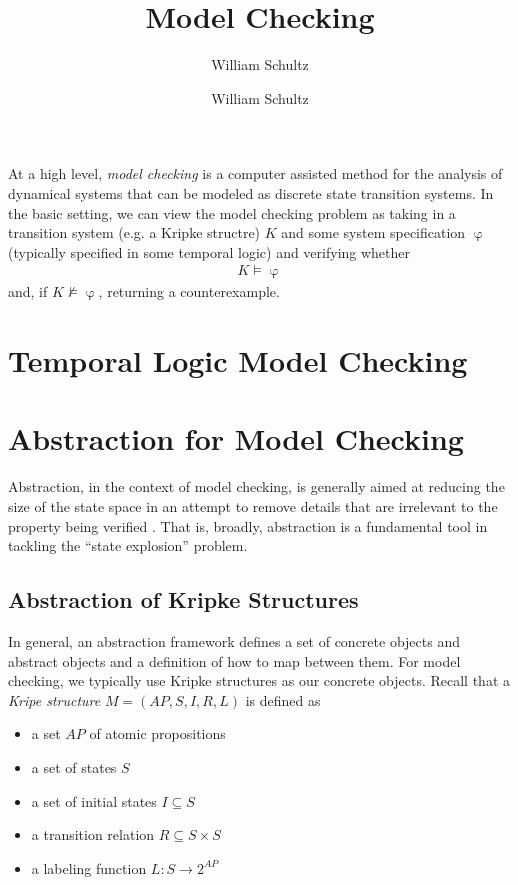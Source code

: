 \documentclass[10pt,a4paper]{article}
\author{William Schultz}
\begin{document}
\title{Model Checking}
\author{William Schultz}
\maketitle

At a high level, \textit{model checking} is a computer assisted method for the analysis of dynamical systems that can be modeled as discrete state transition systems. In the basic setting, we can view the model checking problem as taking in a transition system (e.g. a Kripke structre) $K$ and some system specification $\upvarphi$ (typically specified in some temporal logic)  and verifying whether 
\begin{align*}
    K \vDash \upvarphi
\end{align*}
and, if $K \nvDash \upvarphi$, returning a counterexample.

\section{Temporal Logic Model Checking}




\section{Abstraction for Model Checking}

Abstraction, in the context of model checking, is generally aimed at reducing the size of the state space in an attempt to remove details that are irrelevant to the property being verified \cite{Dams2018}. That is, broadly, abstraction is a fundamental tool in tackling the ``state explosion'' problem.


\subsection*{Abstraction of Kripke Structures}

In general, an abstraction framework defines a set of concrete objects and abstract objects and a definition of how to map between them. For model checking, we typically use Kripke structures as our concrete objects. Recall that a \textit{Kripe structure} $M=(AP,S,I,R,L)$ is defined as
\begin{itemize}
    \item a set $AP$ of atomic propositions
    \item a set of states $S$
    \item a set of initial states $I \subseteq S$
    \item a transition relation $R \subseteq S \times S$
    \item a labeling function $L : S \rightarrow 2^{AP}$
\end{itemize}
\end{document}
